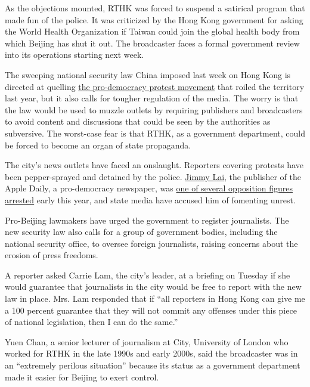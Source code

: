 As the objections mounted, RTHK was forced to suspend a satirical
program that made fun of the police. It was criticized by the Hong Kong
government for asking the World Health Organization if Taiwan could join
the global health body from which Beijing has shut it out. The
broadcaster faces a formal government review into its operations
starting next week.

The sweeping national security law China imposed last week on Hong Kong
is directed at quelling
\href{https://www.nytimes3xbfgragh.onion/2020/06/09/world/asia/hong-kong-protests-one-year-later.html}{the
pro-democracy protest movement} that roiled the territory last year, but
it also calls for tougher regulation of the media. The worry is that the
law would be used to muzzle outlets by requiring publishers and
broadcasters to avoid content and discussions that could be seen by the
authorities as subversive. The worst-case fear is that RTHK, as a
government department, could be forced to become an organ of state
propaganda.

The city's news outlets have faced an onslaught. Reporters covering
protests have been pepper-sprayed and detained by the police.
\href{https://www.nytimes3xbfgragh.onion/2019/08/23/world/asia/jimmy-lai-hong-kong-protests.html}{Jimmy
Lai}, the publisher of the Apple Daily, a pro-democracy newspaper, was
\href{https://www.nytimes3xbfgragh.onion/2020/02/28/world/asia/jimmy-lai-hong-kong-arrested.html}{one
of several opposition figures arrested} early this year, and state media
have accused him of fomenting unrest.

Pro-Beijing lawmakers have urged the government to register journalists.
The new security law also calls for a group of government bodies,
including the national security office, to oversee foreign journalists,
raising concerns about the erosion of press freedoms.

A reporter asked Carrie Lam, the city's leader, at a briefing on Tuesday
if she would guarantee that journalists in the city would be free to
report with the new law in place. Mrs. Lam responded that if ``all
reporters in Hong Kong can give me a 100 percent guarantee that they
will not commit any offenses under this piece of national legislation,
then I can do the same.''

Yuen Chan, a senior lecturer of journalism at City, University of London
who worked for RTHK in the late 1990s and early 2000s, said the
broadcaster was in an ``extremely perilous situation'' because its
status as a government department made it easier for Beijing to exert
control.

